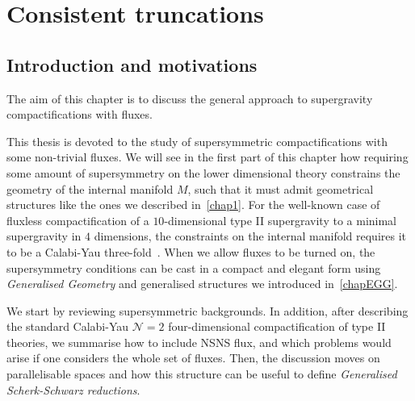 \documentclass[debug]{phd}
\begin{document}
	\chapter{Consistent truncations}
	\label{chapComp}
		\section{Introduction and motivations}
			The aim of this chapter is to discuss the general approach to supergravity compactifications with fluxes.
						
			This thesis is devoted to the study of supersymmetric compactifications with some non-trivial fluxes.
			We will see in the first part of this chapter how requiring some amount of supersymmetry on the lower dimensional theory constrains the geometry of the internal manifold $M$, such that it must admit geometrical structures like the ones we described in~\cref{chap1}.
			For the well-known case of fluxless compactification of a $10$-dimensional type II supergravity to a minimal supergravity in $4$ dimensions, the constraints on the internal manifold requires it to be a Calabi-Yau three-fold~\cite{CYcomp}.
			When we allow fluxes to be turned on, the supersymmetry conditions can be cast in a compact and elegant form using \emph{Generalised Geometry} and generalised structures we introduced in~\cref{chapEGG}.
			
			We start by reviewing supersymmetric backgrounds.
			In addition, after describing the standard Calabi-Yau $\mathcal{N}=2$ four-dimensional compactification of type II theories, we summarise how to include NSNS flux, and which problems would arise if one considers the whole set of fluxes.
			Then, the discussion moves on parallelisable spaces and how this structure can be useful to define \emph{Generalised Scherk-Schwarz reductions}.
\end{document}
